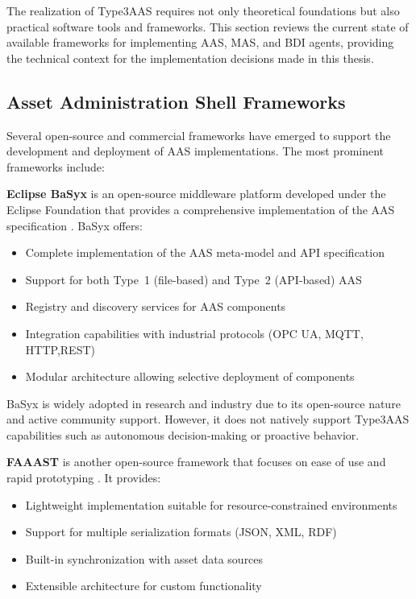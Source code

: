 The realization of \ac{Type3AAS} requires not only theoretical foundations but also practical software tools and frameworks. This section reviews the current state of available frameworks for implementing \ac{AAS}, \ac{MAS}, and \ac{BDI} agents, providing the technical context for the implementation decisions made in this thesis.



\subsection{Asset Administration Shell Frameworks}
\label{subsec:aas_frameworks}
Several open-source and commercial frameworks have emerged to support the development and deployment of \ac{AAS} implementations. The most prominent frameworks include:

\textbf{Eclipse BaSyx} is an open-source middleware platform developed under the Eclipse Foundation that provides a comprehensive implementation of the \ac{AAS} specification \cite{2023basyx}. BaSyx offers:
\begin{itemize}
    \item Complete implementation of the \ac{AAS} meta-model and API specification
    \item Support for both Type~1 (file-based) and Type~2 (API-based) \ac{AAS}
    \item Registry and discovery services for \ac{AAS} components
    \item Integration capabilities with industrial protocols (\ac{OPC UA}, \ac{MQTT}, \ac{HTTP},\ac{REST})
    \item Modular architecture allowing selective deployment of components
\end{itemize}
BaSyx is widely adopted in research and industry due to its open-source nature and active community support. However, it does not natively support \ac{Type3AAS} capabilities such as autonomous decision-making or proactive behavior.

\textbf{\ac{FAAAST}} is another open-source framework that focuses on ease of use and rapid prototyping \cite{2023faast}. It provides:
\begin{itemize}
    \item Lightweight implementation suitable for resource-constrained environments
    \item Support for multiple serialization formats (JSON, XML, RDF)
    \item Built-in synchronization with asset data sources
    \item Extensible architecture for custom functionality
\end{itemize}

